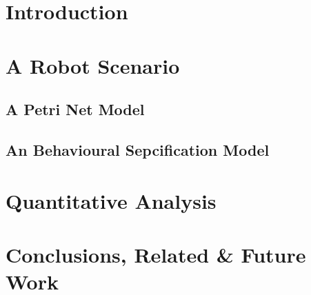 \documentclass[runningheads,a4paper]{llncs}
\begin{document}
\iffinal
\else
 \setcounter{tocdepth}{2}
 \listoffixmes
 \newpage
\fi



\section{Introduction}\label{sec:intro}


\section{A Robot Scenario}\label{sec:robot}


\subsection{A Petri Net Model}\label{sec:abcSTexample}


\subsection{An Behavioural Sepcification Model}\label{sec:modelling}


\section{Quantitative Analysis}\label{sec:analysis}


\section{Conclusions, Related \& Future Work}\label{sec:conc}%





\end{document}
